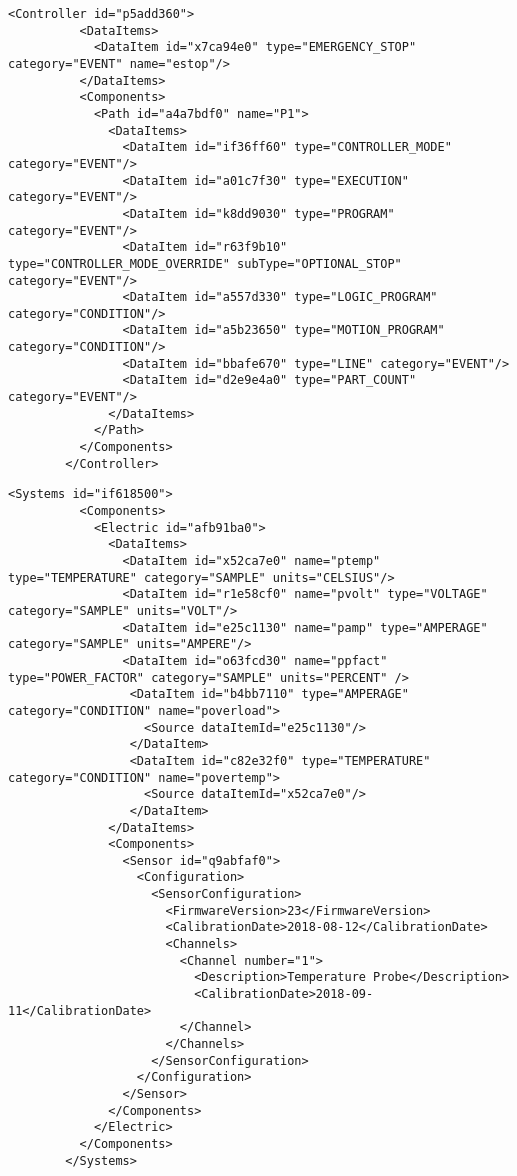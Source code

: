 \begin{lstlisting}[firstnumber=last,%
    caption={Controller and Path Components and Their Data Items},label={lst:controller-component}]
        <Controller id="p5add360">
          <DataItems>
            <DataItem id="x7ca94e0" type="EMERGENCY_STOP" category="EVENT" name="estop"/>
          </DataItems>
          <Components>
            <Path id="a4a7bdf0" name="P1">
              <DataItems>
                <DataItem id="if36ff60" type="CONTROLLER_MODE" category="EVENT"/>
                <DataItem id="a01c7f30" type="EXECUTION" category="EVENT"/>
                <DataItem id="k8dd9030" type="PROGRAM" category="EVENT"/>
                <DataItem id="r63f9b10" type="CONTROLLER_MODE_OVERRIDE" subType="OPTIONAL_STOP" category="EVENT"/>
                <DataItem id="a557d330" type="LOGIC_PROGRAM" category="CONDITION"/>
                <DataItem id="a5b23650" type="MOTION_PROGRAM" category="CONDITION"/>
                <DataItem id="bbafe670" type="LINE" category="EVENT"/>
                <DataItem id="d2e9e4a0" type="PART_COUNT" category="EVENT"/>
              </DataItems>
            </Path>
          </Components>
        </Controller>
\end{lstlisting}

\begin{lstlisting}[firstnumber=last,%
    caption={Electrical System and Sensor Configuration},label={lst:electric-system-example-1}]
        <Systems id="if618500">
          <Components>
            <Electric id="afb91ba0">
              <DataItems>
                <DataItem id="x52ca7e0" name="ptemp" type="TEMPERATURE" category="SAMPLE" units="CELSIUS"/>
                <DataItem id="r1e58cf0" name="pvolt" type="VOLTAGE" category="SAMPLE" units="VOLT"/>
                <DataItem id="e25c1130" name="pamp" type="AMPERAGE" category="SAMPLE" units="AMPERE"/>
                <DataItem id="o63fcd30" name="ppfact" type="POWER_FACTOR" category="SAMPLE" units="PERCENT" />
                 <DataItem id="b4bb7110" type="AMPERAGE" category="CONDITION" name="poverload">
                   <Source dataItemId="e25c1130"/>
                 </DataItem>
                 <DataItem id="c82e32f0" type="TEMPERATURE" category="CONDITION" name="povertemp">
                   <Source dataItemId="x52ca7e0"/>
                 </DataItem>
              </DataItems>
              <Components>
                <Sensor id="q9abfaf0">
                  <Configuration>
                    <SensorConfiguration>
                      <FirmwareVersion>23</FirmwareVersion>
                      <CalibrationDate>2018-08-12</CalibrationDate>
                      <Channels>
                        <Channel number="1">
                          <Description>Temperature Probe</Description>
                          <CalibrationDate>2018-09-11</CalibrationDate>
                        </Channel>
                      </Channels>
                    </SensorConfiguration>
                  </Configuration>
                </Sensor>              
              </Components>
            </Electric>
          </Components>
        </Systems>
\end{lstlisting}


